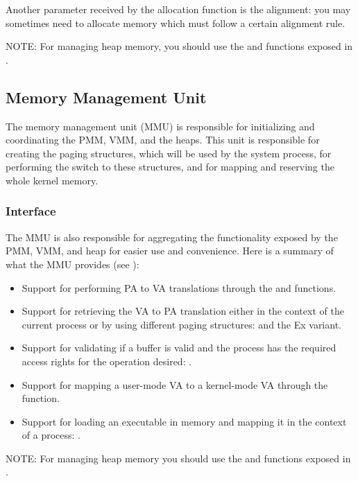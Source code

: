 \begin{appendices}
Another parameter received by the allocation function is the alignment: you may sometimes need to
allocate memory which must follow a certain alignment rule.

NOTE: For managing heap memory, you should use the  and 
 functions exposed in .

\subsection{Memory Management Unit}
\label{sect:MMU}

The memory management unit (MMU) is responsible for initializing and coordinating the PMM, VMM, and
the heaps. This unit is responsible for creating the paging structures, which will be used by the
system process, for performing the switch to these structures, and for mapping and reserving the
whole kernel memory.

\subsubsection{Interface}
The MMU is also responsible for aggregating the functionality exposed by the PMM, VMM, and heap for
easier use and convenience. Here is a summary of what the MMU provides (see ):
\begin{itemize}
	\item Support for performing PA to VA translations through the  and
 functions.

	\item Support for retrieving the VA to PA translation either in the context of the current
process or by using different paging structures:  and the Ex variant.

	\item Support for validating if a buffer is valid and the process has the required access rights
for the operation desired: .

	\item Support for mapping a user-mode VA to a kernel-mode VA through the 
 function.

	\item Support for loading an executable in memory and mapping it in the context of a process:
.
\end{itemize}

NOTE: For managing heap memory you should use the  and 
 functions exposed in .


\end{appendices}

